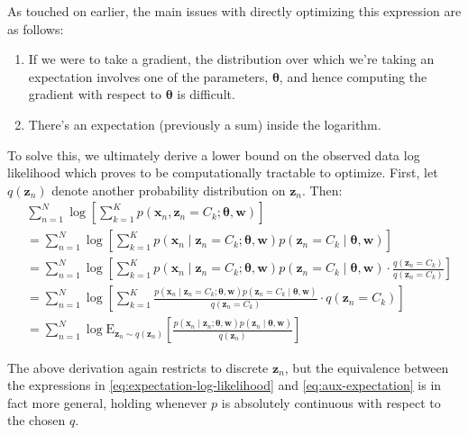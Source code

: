 As touched on earlier, the main issues with directly optimizing this expression are as follows:
\begin{enumerate}
    \item If we were to take a gradient, the distribution over which we're taking an expectation involves one of the parameters, $\boldsymbol\theta$, and hence computing the gradient with respect to $\boldsymbol{\theta}$ is difficult.
    \item There's an expectation (previously a sum) inside the logarithm.
\end{enumerate}

To solve this, we ultimately derive a lower bound on the observed data log likelihood which proves to be computationally tractable to optimize. First, let $q(\mathbf{z}_n)$ denote another probability distribution on $\mathbf{z}_n$. Then:
\begin{align}
    &\sum_{n = 1} ^N \log \left[\sum_{k = 1} ^K p(\mathbf{x}_n, \mathbf{z}_n = C_k; \boldsymbol\theta, \mathbf{w})\right]\nonumber \\
    &= \sum_{n = 1} ^N \log \left[ \sum_{k = 1} ^K p(\mathbf{x}_n \mid \mathbf{z}_n = C_k; \boldsymbol\theta, \mathbf{w}) p(\mathbf{z}_n = C_k \mid \boldsymbol\theta, \mathbf{w} )\right]\nonumber \\
    &= \sum_{n = 1} ^N \log \left[\sum_{k = 1} ^K p(\mathbf{x}_n \mid \mathbf{z}_n = C_k; \boldsymbol\theta, \mathbf{w}) p(\mathbf{z}_n = C_k \mid \boldsymbol\theta, \mathbf{w} ) \cdot \frac{q(\mathbf{z}_n = C_k)}{q(\mathbf{z}_n = C_k)}\right]\nonumber \\
    &= \sum_{n = 1} ^N \log \left[\sum_{k = 1} ^K \frac{p(\mathbf{x}_n \mid \mathbf{z}_n = C_k; \boldsymbol\theta, \mathbf{w}) p(\mathbf{z}_n = C_k \mid \boldsymbol\theta, \mathbf{w} ) }{q(\mathbf{z}_n = C_k)}\cdot q(\mathbf{z}_n = C_k)\right]\nonumber \\
    &= \sum_{n = 1} ^N \log \mathrm{E}_{\mathbf{z}_n \sim q(\mathbf{z}_n)} \left[\frac{p(\mathbf{x}_n \mid \mathbf{z}_n; \boldsymbol\theta, \mathbf{w}) p(\mathbf{z}_n \mid \boldsymbol\theta, \mathbf{w} ) }{q(\mathbf{z}_n)}\right]\label{eq:aux-expectation}
\end{align}

The above derivation again restricts to discrete $\mathbf{z}_n$, but the equivalence between the expressions in  \eqref{eq:expectation-log-likelihood} and \eqref{eq:aux-expectation} is in fact more general, holding whenever $p$ is absolutely continuous with respect to the chosen $q$. 


